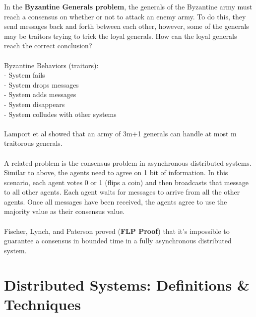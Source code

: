 \documentclass[twoside]{article}
\begin{document}
In the \textbf{Byzantine Generals problem}, the generals of the Byzantine army must reach a consensus on whether or not to attack an enemy army.  To do this, they send messages back and forth between each other, however, some of the generals may be traitors trying to trick the loyal generals.  How can the loyal generals reach the correct conclusion?\\
\\
Byzantine Behaviors (traitors):\\
- System fails\\
- System drops messages\\
- System adds messages\\
- System disappears\\
- System colludes with other systems\\
\\
Lamport et al showed that an army of 3m+1 generals can handle at most m traitorous generals.\\
\\
A related problem is the consensus problem in asynchronous distributed systems.  Similar to above, the agents need to agree on 1 bit of information.  In this scenario, each agent votes 0 or 1 (flips a coin) and then broadcasts that message to all other agents.  Each agent waits for messages to arrive from all the other agents.  Once all messages have been received, the agents agree to use the majority value as their consensus value.\\
\\
Fischer, Lynch, and Paterson proved (\textbf{FLP Proof}) that it's impossible to guarantee a consensus in bounded time in a fully asynchronous distributed system.

\section{Distributed Systems: Definitions \& Techniques}
\end{document}
